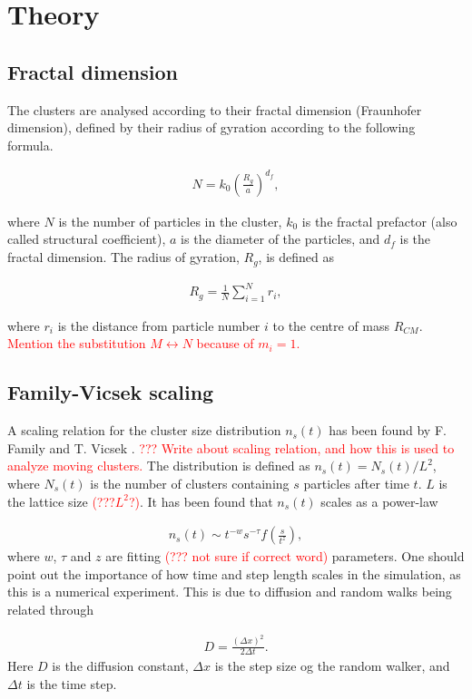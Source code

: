 \section{Theory}

\subsection{Fractal dimension}
The clusters are analysed according to their fractal dimension (Fraunhofer dimension), defined by their radius of gyration according to the following formula.

\begin{align}
N = k_0\left(\frac{R_g}{a}\right)^{d_f},
\label{eq:N_Rg_rel}
\end{align}

where $N$ is the number of particles in the cluster, $k_0$ is the fractal prefactor (also called structural coefficient), $a$ is the diameter of the particles, and $d_f$ is the fractal dimension. The radius of gyration, $R_g$, is defined as 

\begin{align}
R_g = \frac{1}{N} \sum_{i=1}^{N} r_i, 
\end{align}

where $r_i$ is the distance from particle number $i$ to the centre of mass $R_{CM}$. \textcolor{red}{Mention the substitution $M \leftrightarrow N$ because of $m_i = 1$. }

\subsection{Family-Vicsek scaling}
A scaling relation for the cluster size distribution $n_s(t)$ has been found by F. Family and T. Vicsek \cite{PhysRevLett.52.1669}. \textcolor{red}{??? Write about scaling relation, and how this is used to analyze moving clusters.} The distribution is defined as $n_s(t) = N_s(t) / L^2$, where $N_s(t)$ is the number of clusters containing $s$ particles after time $t$. $L$ is the lattice size \textcolor{red}{(???$L^2$?)}. It has been found that $n_s(t)$ scales as a power-law

\begin{align}
n_s(t) \sim t^{-w}s^{-\tau}f\left(\frac{s}{t^z}\right),
\end{align}
where $w$, $\tau$ and $z$ are fitting \textcolor{red}{(??? not sure if correct word)} parameters. One should point out the importance of how time and step length scales in the simulation, as this is a numerical experiment. This is due to diffusion and random walks being related through

\begin{align}
D = \frac{(\Delta x)^2}{2\Delta t}.
\label{eq:diffusion_walker_relation}
\end{align}
Here $D$ is the diffusion constant, $\Delta x$ is the step size og the random walker, and $\Delta t$ is the time step. 